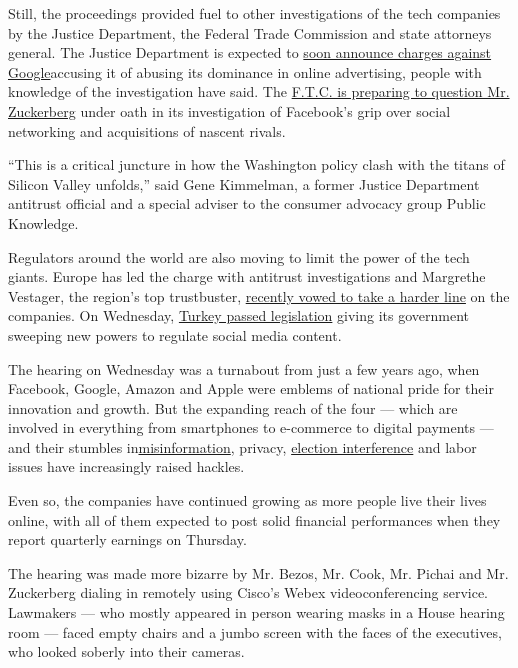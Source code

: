 Still, the proceedings provided fuel to other investigations of the tech
companies by the Justice Department, the Federal Trade Commission and
state attorneys general. The Justice Department is expected to
\href{https://www.nytimes.com/2020/06/25/technology/barr-google-investigation.html}{soon
announce charges against Google}accusing it of abusing its dominance in
online advertising, people with knowledge of the investigation have
said. The
\href{https://www.nytimes.com/2020/07/17/technology/ftc-facebook-investigation.html}{F.T.C.
is preparing to question Mr. Zuckerberg} under oath in its investigation
of Facebook's grip over social networking and acquisitions of nascent
rivals.

``This is a critical juncture in how the Washington policy clash with
the titans of Silicon Valley unfolds,'' said Gene Kimmelman, a former
Justice Department antitrust official and a special adviser to the
consumer advocacy group Public Knowledge.

Regulators around the world are also moving to limit the power of the
tech giants. Europe has led the charge with antitrust investigations and
Margrethe Vestager, the region's top trustbuster,
\href{https://www.nytimes.com/2019/11/19/technology/tech-regulator-europe.html}{recently
vowed to take a harder line} on the companies. On Wednesday,
\href{https://www.nytimes.com/2020/07/29/world/europe/turkey-social-media-control.html}{Turkey
passed legislation} giving its government sweeping new powers to
regulate social media content.

The hearing on Wednesday was a turnabout from just a few years ago, when
Facebook, Google, Amazon and Apple were emblems of national pride for
their innovation and growth. But the expanding reach of the four ---
which are involved in everything from smartphones to e-commerce to
digital payments --- and their stumbles
in\href{https://www.nytimes.com/2020/07/28/technology/virus-video-trump.html}{misinformation},
privacy,
\href{https://www.nytimes.com/2018/02/17/technology/indictment-russian-tech-facebook.html}{election
interference} and labor issues have increasingly raised hackles.

Even so, the companies have continued growing as more people live their
lives online, with all of them expected to post solid financial
performances when they report quarterly earnings on Thursday.

The hearing was made more bizarre by Mr. Bezos, Mr. Cook, Mr. Pichai and
Mr. Zuckerberg dialing in remotely using Cisco's Webex videoconferencing
service. Lawmakers --- who mostly appeared in person wearing masks in a
House hearing room --- faced empty chairs and a jumbo screen with the
faces of the executives, who looked soberly into their cameras.

